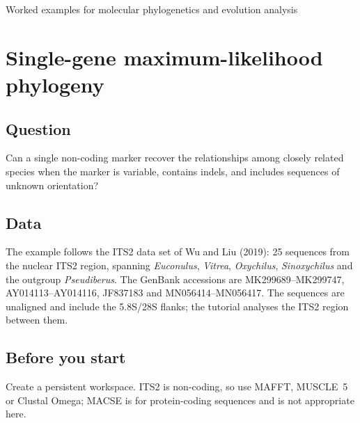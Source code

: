 \documentclass[11pt]{report}
\begin{document}
  {Worked examples for molecular phylogenetics and evolution analysis}
\tableofcontents

\chapter{Single-gene maximum-likelihood phylogeny}
\section{Question}
Can a single non-coding marker recover the relationships among closely
related species when the marker is variable, contains indels, and includes
sequences of unknown orientation?

\section{Data}
The example follows the ITS2 data set of Wu and Liu (2019): 25 sequences from
the nuclear ITS2 region, spanning \textit{Euconulus}, \textit{Vitrea},
\textit{Oxychilus}, \textit{Sinoxychilus} and the outgroup
\textit{Pseudiberus}. The GenBank accessions are MK299689--MK299747,
AY014113--AY014116, JF837183 and MN056414--MN056417. The sequences are
unaligned and include the 5.8S/28S flanks; the tutorial analyses the ITS2
region between them.

\section{Before you start}
Create a persistent workspace. ITS2 is non-coding, so use MAFFT, MUSCLE~5 or
Clustal Omega; MACSE is for protein-coding sequences and is not appropriate
here.
\end{document}

